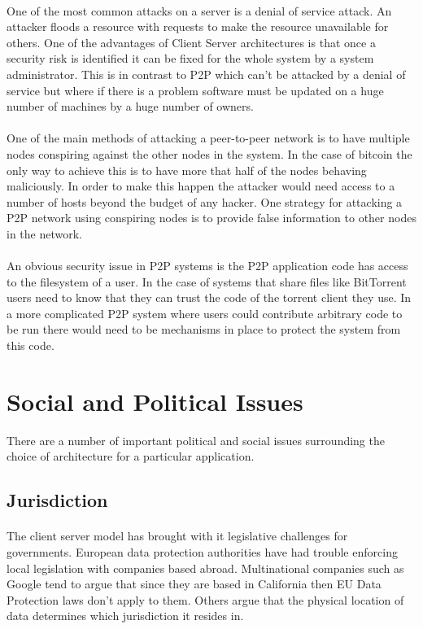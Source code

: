\documentclass[11pt]{amsart}
\begin{document}
\paragraph{}
One of the most common attacks on a server is a denial of service attack. An attacker floods a resource with requests to make the resource unavailable for others.\cite{DistSys} One of the advantages of Client Server architectures is that once a security risk is identified it can be fixed for the whole system by a system administrator. This is in contrast to P2P which can't be attacked by a denial of service but where if there is a problem software must be updated on a huge number of machines by a huge number of owners.
\paragraph{}
One of the main methods of attacking a peer-to-peer network is to have multiple nodes conspiring against the other nodes in the system. In the case of bitcoin the only way to achieve this is to have more that half of the nodes behaving maliciously.\cite{bitcoin} In order to make this happen the attacker would need access to a number of hosts beyond the budget of any hacker. One strategy for attacking a P2P network using conspiring nodes is to provide false information to other nodes in the network.
\paragraph{}
An obvious security issue in P2P systems is the P2P application code has access to the filesystem of a user. In the case of systems that share files like BitTorrent users need to know that they can trust the code of the torrent client they use. In a more complicated P2P system where users could contribute arbitrary code to be run there would need to be mechanisms in place to protect the system from this code.

\section{Social and Political Issues}

There are a number of important political and social issues surrounding the choice of architecture for a particular application.

\subsection{Jurisdiction}
\paragraph{}
The client server model has brought with it legislative challenges for governments. European data protection authorities have had trouble enforcing local legislation with companies based abroad. Multinational companies such as Google tend to argue that since they are based in California then EU Data Protection laws don't apply to them. Others argue that the physical location of data determines which jurisdiction it resides in. 
\end{document}
